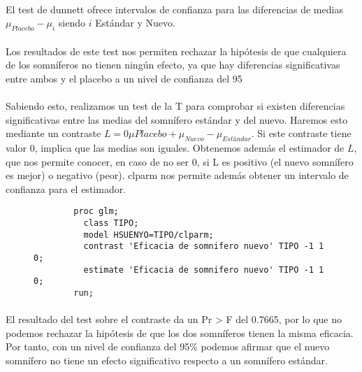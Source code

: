 \documentclass{article}
\begin{document}
    \paragraph{}
    El test de dunnett ofrece intervalos de confianza para las diferencias de medias $\mu_{Placebo} - \mu_{i}$ siendo $i$ Estándar y Nuevo.

    \paragraph{}
    Los resultados de este test nos permiten rechazar la hipótesis de que cualquiera de los somníferos no tienen ningún efecto, ya que hay diferencias significativas entre ambos y el placebo a un nivel de confianza del 95%

    \paragraph{}
    Sabiendo esto, realizamos un test de la T para comprobar si existen diferencias significativas entre las medias del somnífero estándar y del nuevo. Haremos esto mediante un contraste $L=0\mu{Placebo} + \mu_{Nuevo} - \mu_{Estándar}$. Si este contraste tiene valor 0, implica que las medias son iguales. Obtenemos además el estimador de $L$, que nos permite conocer, en caso de no ser 0, si L es positivo (el nuevo somnífero es mejor) o negativo (peor). clparm nos permite además obtener un intervalo de confianza para el estimador.

    \begin{figure}[h]
      \centering
      \begin{verbatim}
        proc glm;
          class TIPO;
          model HSUENYO=TIPO/clparm;
          contrast 'Eficacia de somnifero nuevo' TIPO -1 1 0;
          estimate 'Eficacia de somnifero nuevo' TIPO -1 1 0;
        run;
      \end{verbatim}
      \caption{}
      \label{code:sas_2}
    \end{figure}

    \paragraph{}
    El resultado del test sobre el contraste da un Pr > F del 0.7665, por lo que no podemos rechazar la hipótesis de que los dos somníferos tienen la misma eficacia. Por tanto, con un nivel de confianza del 95\% podemos afirmar que el nuevo somnífero no tiene un efecto significativo respecto a un somnífero estándar.
\end{document}
